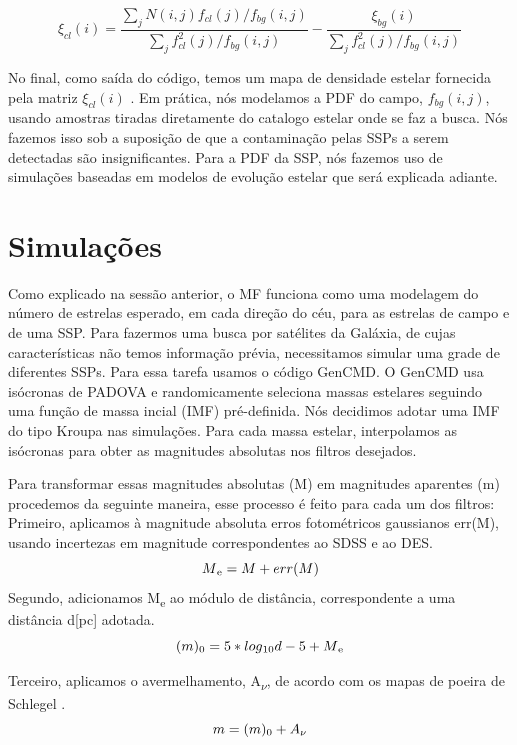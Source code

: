 \documentclass[
	12pt,				%
	openany,			%
	oneside,			%
	a4paper,			%
	english,			%
	brazil				%
	]{abntex2}
\begin{document}
\begin{equation}
\xi_{cl}(i) = \frac{\sum\limits_{j}N(i,j)f_{cl}(j)/f_{bg}(i,j)}{\sum\limits_{j}f_{cl}^2(j)/f_{bg}(i,j)} - \frac{\xi_{bg}(i)}{\sum\limits_{j}f_{cl}^2(j)/f_{bg}(i,j)}
\end{equation}

No final, como saída do código, temos um mapa de densidade estelar fornecida pela matriz  $\xi_{cl}(i)$ . 
Em prática, nós modelamos a PDF do campo, $f_{bg}(i,j)$, usando amostras tiradas diretamente do catalogo estelar onde se faz a busca. Nós fazemos isso sob a suposição de que a contaminação pelas SSPs a serem detectadas são insignificantes. Para a PDF da SSP, nós fazemos uso de simulações baseadas em modelos de evolução estelar que será explicada adiante. 

\chapter{Simulações}


Como explicado na sessão anterior, o MF funciona como uma modelagem do número de estrelas esperado,  em cada direção do céu, para as estrelas de campo e de uma SSP. Para fazermos uma busca por satélites da Galáxia, de cujas características não temos informação prévia,  necessitamos simular uma grade de diferentes SSPs. Para essa tarefa usamos o código GenCMD. O  GenCMD usa isócronas de PADOVA \cite{2012MNRAS.427..127B} e randomicamente seleciona massas estelares seguindo uma função de massa incial (IMF) pré-definida. Nós decidimos adotar uma IMF do tipo Kroupa \cite{2001MNRAS.322..231K} nas simulações. Para cada massa estelar, interpolamos as isócronas para obter as magnitudes absolutas nos filtros desejados.\par
Para transformar essas magnitudes absolutas (M) em magnitudes aparentes (m) procedemos da seguinte maneira, esse processo é feito para cada um dos filtros:
Primeiro, aplicamos à magnitude absoluta erros fotométricos gaussianos err(M), usando incertezas em magnitude correspondentes ao SDSS e ao DES. 
	\begin{equation}
	M\textsubscript{e} = M + err(M) 
	\end{equation}
Segundo, adicionamos M\textsubscript{e} ao módulo de distância, correspondente a uma distância d[pc] adotada.
	\begin{equation}
	(m)\textsubscript{0} = 5*log\textsubscript{10} d  -5 + M\textsubscript{e}
	\end{equation}

Terceiro, aplicamos o avermelhamento, A\textsubscript{$\nu$}, de acordo com os mapas de poeira de Schlegel \cite{1998ApJ...500..525S}.
	\begin{equation}
	m =  (m)\textsubscript{0} + A\textsubscript{$\nu$}
	\end{equation}			
						
\end{document}

